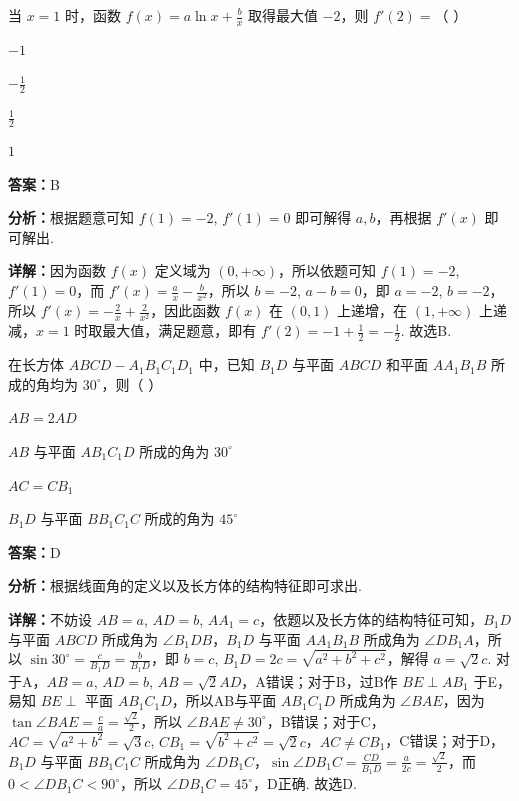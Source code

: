 \begin{question}[points=5]
当 $x=1$ 时，函数 $f(x)=a\ln x + \frac{b}{x}$ 取得最大值 $-2$，则 $f'(2)=$（ ）
\begin{choices}
  \item $-1$
  \item $-\frac{1}{2}$
  \item $\frac{1}{2}$
  \item $1$
\end{choices}
\begin{solution}
\textbf{答案：}B

\textbf{分析：}根据题意可知 $f(1)=-2$, $f'(1)=0$ 即可解得 $a,b$，再根据 $f'(x)$ 即可解出.

\textbf{详解：}因为函数 $f(x)$ 定义域为 $(0,+\infty)$，所以依题可知 $f(1)=-2$, $f'(1)=0$，而 $f'(x)=\frac{a}{x}-\frac{b}{x^2}$，所以 $b=-2$, $a-b=0$，即 $a=-2$, $b=-2$，所以 $f'(x)=-\frac{2}{x}+\frac{2}{x^2}$，因此函数 $f(x)$ 在 $(0,1)$ 上递增，在 $(1,+\infty)$ 上递减，$x=1$ 时取最大值，满足题意，即有 $f'(2)=-1+\frac{1}{2}=-\frac{1}{2}$. 故选B.
\end{solution}
\end{question}

\begin{question}[points=5]
在长方体 $ABCD-A_1B_1C_1D_1$ 中，已知 $B_1D$ 与平面 $ABCD$ 和平面 $AA_1B_1B$ 所成的角均为 $30^\circ$，则（ ）
\begin{choices}
  \item $AB=2AD$
  \item $AB$ 与平面 $AB_1C_1D$ 所成的角为 $30^\circ$
  \item $AC=CB_1$
  \item $B_1D$ 与平面 $BB_1C_1C$ 所成的角为 $45^\circ$
\end{choices}
\begin{solution}
\textbf{答案：}D

\textbf{分析：}根据线面角的定义以及长方体的结构特征即可求出.

\textbf{详解：}不妨设 $AB=a$, $AD=b$, $AA_1=c$，依题以及长方体的结构特征可知，$B_1D$ 与平面 $ABCD$ 所成角为 $\angle B_1DB$，$B_1D$ 与平面 $AA_1B_1B$ 所成角为 $\angle DB_1A$，所以 $\sin30^\circ=\frac{c}{B_1D}=\frac{b}{B_1D}$，即 $b=c$, $B_1D=2c=\sqrt{a^2+b^2+c^2}$，解得 $a=\sqrt{2}c$. 对于A，$AB=a$, $AD=b$, $AB=\sqrt{2}AD$，A错误；对于B，过B作 $BE\perp AB_1$ 于E，易知 $BE\perp$ 平面 $AB_1C_1D$，所以AB与平面 $AB_1C_1D$ 所成角为 $\angle BAE$，因为 $\tan\angle BAE=\frac{c}{a}=\frac{\sqrt{2}}{2}$，所以 $\angle BAE\neq30^\circ$，B错误；对于C，$AC=\sqrt{a^2+b^2}=\sqrt{3}c$, $CB_1=\sqrt{b^2+c^2}=\sqrt{2}c$，$AC\neq CB_1$，C错误；对于D，$B_1D$ 与平面 $BB_1C_1C$ 所成角为 $\angle DB_1C$，$\sin\angle DB_1C=\frac{CD}{B_1D}=\frac{a}{2c}=\frac{\sqrt{2}}{2}$，而 $0<\angle DB_1C<90^\circ$，所以 $\angle DB_1C=45^\circ$，D正确. 故选D.
\end{solution}
\end{question}

